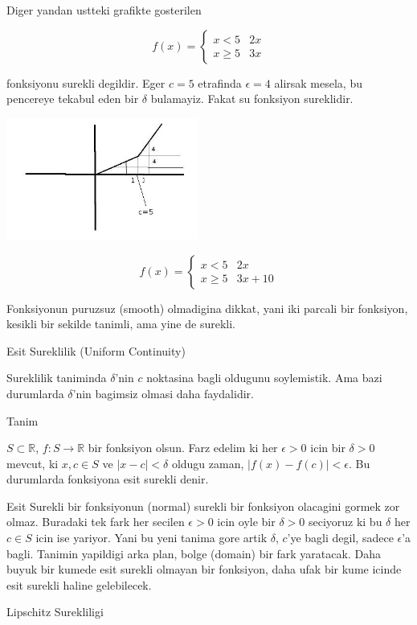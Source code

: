 \documentclass[12pt,fleqn]{article}
\begin{document}
Diger yandan ustteki grafikte gosterilen 

\[ 
f(x) = 
\left\{ \begin{array}{ll}
x < 5 & 2x \\
x \ge 5 & 3x
\end{array} \right.
 \]

fonksiyonu surekli degildir. Eger $c=5$ etrafinda $\epsilon = 4$ alirsak
mesela, bu pencereye tekabul eden bir $\delta$ bulamayiz. Fakat su
fonksiyon sureklidir.

\includegraphics[height=4cm]{2_3.png}

\[ 
f(x) = 
\left\{ \begin{array}{ll}
x < 5 & 2x \\
x \ge 5 & 3x + 10
\end{array} \right.
 \]

Fonksiyonun puruzsuz (smooth) olmadigina dikkat, yani iki parcali bir
fonksiyon, kesikli bir sekilde tanimli, ama yine de surekli. 

Esit Sureklilik (Uniform Continuity) 

Sureklilik taniminda $\delta$'nin $c$ noktasina bagli oldugunu
soylemistik. Ama bazi durumlarda $\delta$'nin bagimsiz olmasi daha
faydalidir. 

Tanim

$S \subset \mathbb{R}$, $f:S \to \mathbb{R}$ bir fonksiyon olsun. Farz edelim ki her $\epsilon > 0$ icin 
bir $\delta > 0$ mevcut, ki $x,c \in S$ ve $|x-c| < \delta$ oldugu zaman, $|f(x) - f(c)| < \epsilon$. 
Bu durumlarda fonksiyona esit surekli denir. 

Esit Surekli bir fonksiyonun (normal) surekli bir fonksiyon olacagini
gormek zor olmaz. Buradaki tek fark her secilen $\epsilon > 0$ icin oyle
bir $\delta > 0$ seciyoruz ki bu $\delta$ her $c \in S$ icin ise
yariyor. Yani bu yeni tanima gore artik $\delta$, $c$'ye bagli degil,
sadece $\epsilon$'a bagli. Tanimin yapildigi arka plan, bolge (domain)
bir fark yaratacak. Daha buyuk bir kumede esit surekli olmayan bir
fonksiyon, daha ufak bir kume icinde esit surekli haline gelebilecek. 

Lipschitz Surekliligi 
\end{document}
